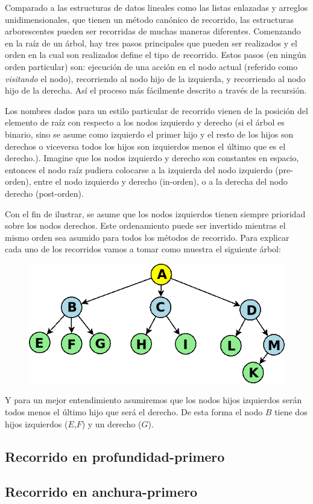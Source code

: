 Comparado a las estructuras de datos lineales como las listas enlazadas y arreglos unidimensionales, que tienen un método canónico de recorrido, las estructuras arborescentes pueden ser recorridas de muchas maneras diferentes. Comenzando en la raíz de un árbol, hay tres pasos principales que pueden ser realizados y el orden en la cual son realizados define el tipo de recorrido. Estos pasos (en ningún orden particular) son: ejecución de una acción en el nodo actual (referido como \emph{visitando} el nodo), recorriendo al nodo hijo de la izquierda, y recorriendo al nodo hijo de la derecha. Así el proceso más fácilmente descrito a través de la recursión. 

Los nombres dados para un estilo particular de recorrido vienen de la posición del elemento de raíz con respecto a los nodos izquierdo y derecho (si el árbol es binario, sino se asume como izquierdo el primer hijo y el resto de los hijos son derechos o viceversa todos los hijos son izquierdos menos el último que es el derecho.). Imagine que los nodos izquierdo y derecho son constantes en espacio, entonces el nodo raíz pudiera colocarse a la izquierda del nodo izquierdo (pre-orden), entre el nodo izquierdo y derecho (in-orden), o a la derecha del nodo derecho (post-orden).

Con el fin de ilustrar, se asume que los nodos izquierdos tienen siempre prioridad sobre los nodos derechos. Este ordenamiento puede ser invertido mientras el mismo orden sea asumido para todos los métodos de recorrido. Para explicar cada uno de los recorridos vamos a tomar como muestra el siguiente árbol:

\begin{figure}[h!]
	\centering
	\includegraphics[width=0.7\linewidth]{img/tree_example}
	\label{fig:treeexample}
\end{figure}

Y para un mejor entendimiento asumiremos que los nodos hijos izquierdos serán todos menos el último hijo que será el derecho. De esta forma el nodo $B$ tiene dos hijos izquierdos ($E$,$F$) y un derecho ($G$).

\subsection{Recorrido en profundidad-primero}


\subsection{Recorrido en anchura-primero}
